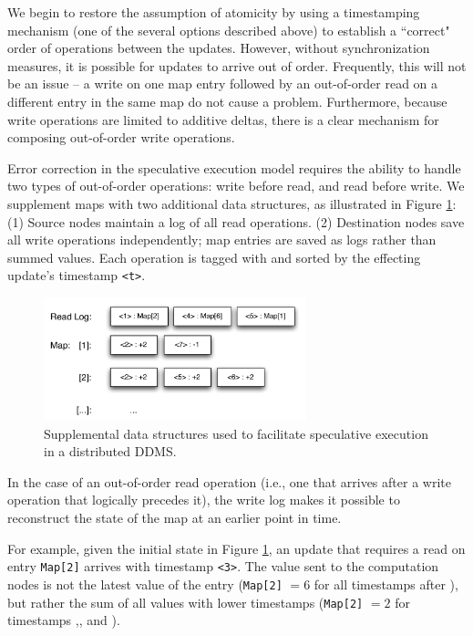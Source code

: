We begin to restore the assumption of atomicity by using a timestamping mechanism (one of the several options described above) to establish a ``correct" order of operations between the updates.  However, without synchronization measures, it is possible for updates to arrive out of order.  Frequently, this will not be an issue -- a write on one map entry followed by an out-of-order read on a different entry in the same map do not cause a problem.  Furthermore, because write operations are limited to additive deltas, there is a clear mechanism for composing out-of-order write operations.  

Error correction in the speculative execution model requires the ability to handle two types of out-of-order operations: write before read, and read before write.  We supplement maps with two additional data structures, as illustrated in Figure \ref{fig:speculativeStorage}:  (1) Source nodes maintain a log of all read operations.  (2) Destination nodes save all write operations independently; map entries are saved as logs rather than summed values.  Each operation is tagged with and sorted by the effecting update's timestamp \texttt{<t>}.

\begin{figure}
\begin{center}
\includegraphics[width=3.0in]{graphics/speculative_storage}
\end{center}
\caption{Supplemental data structures used to facilitate speculative execution in a distributed DDMS.}
\label{fig:speculativeStorage}
\end{figure}

In the case of an out-of-order read operation (i.e., one that arrives after a write operation that logically precedes it), the write log makes it possible to reconstruct the state of the map at an earlier point in time.  

For example, given the initial state in Figure \ref{fig:speculativeStorage}, an update that requires a read on entry \texttt{Map[2]} arrives with timestamp \texttt{<3>}.  The value sent to the computation nodes is not the latest value of the entry ({\tt Map[2]} $ = 6$ for all timestamps after {\tt <6>}), but rather the sum of all values with lower timestamps ({\tt Map[2]} $ = 2$ for timestamps {\tt <3>},{\tt <4>}, and {\tt <5>}).

